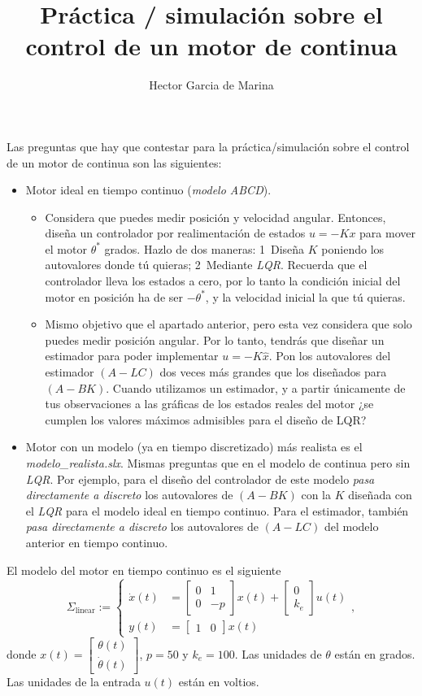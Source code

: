 \documentclass[11pt,a4paper,titlepage]{article}
\title{Práctica / simulación sobre el control de un motor de continua}
\author{Hector Garcia de Marina}
\begin{document}
Las preguntas que hay que contestar para la práctica/simulación sobre el control de un motor de continua son las siguientes:

\begin{itemize}
	\item Motor ideal en tiempo continuo (\emph{modelo ABCD}).
		\begin{itemize}
			\item Considera que puedes medir posición y velocidad angular. Entonces, diseña un controlador por realimentación de estados $u = -Kx$ para mover el motor $\theta^*$ grados. Hazlo de dos maneras: 1\ Diseña $K$ poniendo los autovalores donde tú quieras; 2\ Mediante \emph{LQR}. Recuerda que el controlador lleva los estados a cero, por lo tanto la condición inicial del motor en posición ha de ser $-\theta^*$, y la velocidad inicial la que tú quieras.

			\item Mismo objetivo que el apartado anterior, pero esta vez considera que solo puedes medir posición angular. Por lo tanto, tendrás que diseñar un estimador para poder implementar $u = -K\hat x$. Pon los autovalores del estimador $(A-LC)$ dos veces más grandes que los diseñados para $(A-BK)$. Cuando utilizamos un estimador, y a partir únicamente de tus observaciones a las gráficas de los estados reales del motor ¿se cumplen los valores máximos admisibles para el diseño de LQR?
		\end{itemize}
	\item Motor con un modelo (ya en tiempo discretizado) más realista es el \emph{modelo\_realista.slx}. Mismas preguntas que en el modelo de continua pero sin \emph{LQR}. Por ejemplo, para el diseño del controlador de este modelo \emph{pasa directamente a discreto} los autovalores de $(A-BK)$ con la $K$ diseñada con el \emph{LQR} para el modelo ideal en tiempo continuo. Para el estimador, también \emph{pasa directamente a discreto} los autovalores de $(A-LC)$ del modelo anterior en tiempo continuo.
\end{itemize}

El modelo del motor en tiempo continuo es el siguiente
\begin{equation}
	\Sigma_{\text{linear}} := \begin{cases}
		\dot x(t) &= \begin{bmatrix}0 & 1 \\ 0 & -p\end{bmatrix}x(t) + \begin{bmatrix}0 \\ k_e\end{bmatrix} u(t) \\
			y(t) &= \begin{bmatrix}1 & 0\end{bmatrix}x(t)
	\end{cases},
\label{eq: sigmalin}
\end{equation}
donde $x(t) = \begin{bmatrix}\theta(t) \\ \dot\theta(t) \end{bmatrix}$, $p = 50$ y $k_e = 100$. Las unidades de $\theta$ están en grados. Las unidades de la entrada $u(t)$ están en voltios.
\end{document}
